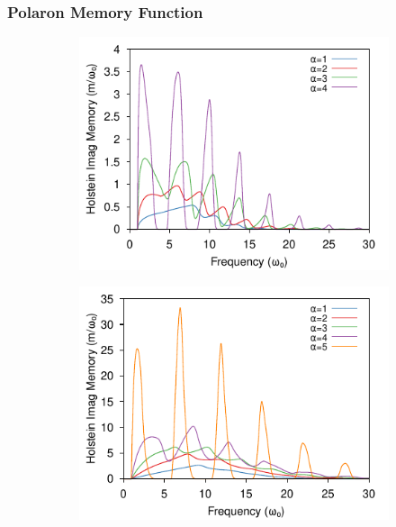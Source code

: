 \subsubsection{Polaron Memory Function}

\begin{figure}
\centering
  \begin{subfigure}[b]{0.49\textwidth}
    \includegraphics[width=\textwidth]{figures/holstein-1d-imag-memory-freq-COLOUR.pdf}
  \end{subfigure}
  \begin{subfigure}[b]{0.49\textwidth}
    \includegraphics[width=\textwidth]{figures/holstein-2d-imag-memory-freq-COLOUR.pdf}
  \end{subfigure}

\end{figure}
